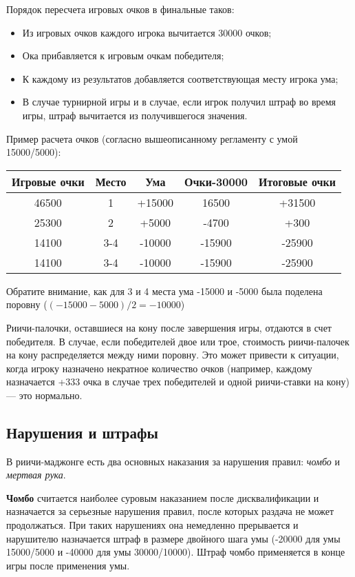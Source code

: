 Порядок пересчета игровых очков в финальные таков:
\begin{itemize}
	\item Из игровых очков каждого игрока вычитается 30000 очков;
	\item Ока прибавляется к игровым очкам победителя;
	\item К каждому из результатов добавляется соответствующая месту игрока ума;
	\item В случае турнирной игры и в случае, если игрок получил штраф во время игры, штраф вычитается из получившегося значения.
\end{itemize}

Пример расчета очков (согласно вышеописанному регламенту с умой 15000/5000):

\noindent\begin{tabular}{ccccc}
	\toprule
	Игровые очки & Место & Ума & Очки-30000 & Итоговые очки \\	
	\midrule
	46500 & 1 & +15000 & 16500 & +31500 \\
	\midrule
	25300 & 2 & +5000 & -4700 & +300 \\
	\midrule
	14100 & 3-4 & -10000 & -15900 & -25900 \\
	\midrule
	14100 & 3-4 & -10000 & -15900 & -25900 \\
	\bottomrule
\end{tabular}

Обратите внимание, как для 3 и 4 места ума -15000 и -5000 была поделена поровну (\begin{math}(-15000-5000)/2 = -10000\end{math})

Риичи-палочки, оставшиеся на кону после завершения игры, отдаются в счет победителя. В случае, если победителей двое или трое, стоимость риичи-палочек на кону распределяется между ними поровну. Это может привести к ситуации, когда игроку назначено некратное количество очков (например, каждому назначается +333 очка в случае трех победителей и одной риичи-ставки на кону) --- это нормально.

\subsection{Нарушения и штрафы}

В риичи-маджонге есть два основных наказания за нарушения правил: \textit{чомбо} и \textit{мертвая рука}.

\textbf{Чомбо} считается наиболее суровым наказанием после дисквалификации и назначается за серьезные нарушения правил, после которых раздача не может продолжаться. При таких нарушениях она немедленно прерывается и нарушителю назначается штраф в размере двойного шага умы (-20000 для умы 15000/5000 и -40000 для умы 30000/10000). Штраф чомбо применяется в конце игры после применения умы. 

